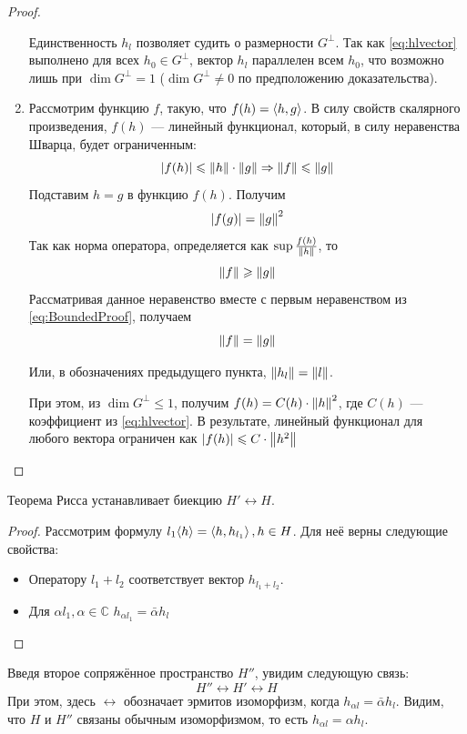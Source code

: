 \documentclass[12pt]{article}
\begin{document}
\begin{proof}
\begin{enumerate}
			{\footnotesize
				Единственность $h_l$ позволяет судить о размерности $G^{\perp}$.
				Так как \eqref{eq:hlvector} выполнено для всех $h_0 \in G^{\perp}$, вектор $h_l$ параллелен всем $h_0$, 
				что возможно лишь при $\dim{G^{\perp}} = 1$ ($\dim{G^{\perp}} \neq 0$ по предположению доказательства).
			}
			
			\item Рассмотрим функцию $f$, такую, что $f(h) = \left\langle h, g \right\rangle$. В силу свойств скалярного произведения, 
			$f(h)$ --- линейный функционал, который, в силу неравенства Шварца, будет ограниченным:
			\begin{equation} \label{eq:BoundedProof}
				|f(h)| \leqslant \left\| h \right\| \cdot \left\| g \right\| \Rightarrow \left\| f \right\| \leqslant \left\| g \right\|
			\end{equation}
			Подставим $h = g$ в функцию $f(h)$. Получим
			$$|f(g)| = \left\| g \right\|^2$$
			Так как норма оператора, определяется как $\sup \frac{f(h)}{\left\| h \right\|}$, то 
			$$\left\| f \right\| \geqslant \left\| g \right\|$$
			Рассматривая данное неравенство вместе с первым неравенством из \eqref{eq:BoundedProof}, получаем 
			$$ \left\| f \right\| = \left\| g \right\| $$
			
			Или, в обозначениях предыдущего пункта, $\left\| h_l \right\| = \left\| l \right\|$.
			
			{\footnotesize
				При этом, из $\dim{G^{\perp}} \leq 1$, получим $f(h) = C(h) \cdot \left\| h \right\|^2$, где $C(h)$ --- коэффициент из 
				\eqref{eq:hlvector}. В результате, линейный функционал для любого вектора ограничен как 
				$|f(h)| \leqslant C \cdot \left\| h^2 \right\|$
			}
		\end{enumerate}
	\end{proof}
	
	\begin{note}
		Теорема Рисса устанавливает биекцию $H' \leftrightarrow H$.
	\end{note}
	\begin{proof}
		Рассмотрим формулу $l_1\langle h \rangle = \left\langle h, h_{l_1} \right\rangle, h \in H$. Для неё верны следующие
		свойства:
		\begin{itemize}
			\item Оператору $l_1 + l_2$ соответствует вектор $h_{l_1+l_2}$.
			\item Для $\alpha l_1, \alpha \in \mathbb{C}$ $h_{\alpha l_1} = \bar{\alpha} h_l$
		\end{itemize}
	\end{proof}
	
	Введя второе сопряжённое пространство $H''$, увидим следующую связь:
	$$H'' \leftrightarrow H' \leftrightarrow H$$
	При этом, здесь $\leftrightarrow$ обозначает эрмитов изоморфизм, когда 
	$h_{\alpha l} = \bar{\alpha} h_l$. %
	Видим, что $H$ и $H''$ связаны обычным изоморфизмом, то есть $h_{\alpha l} = \alpha h_l$.
	
\end{document}
